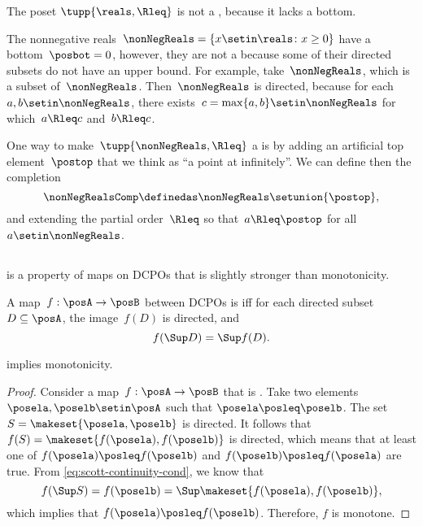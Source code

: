 \begin{example}
    \label{exa:Rcomp}
    The poset $\tupp{\reals, \Rleq}$ is not a \CPO, because it lacks a bottom.

    The nonnegative reals~$\nonNegReals=\{x\setin\reals \colon x\geq0\}$ have a bottom~$\posbot=0$, however, they are not a \DCPO because some of their directed subsets do not have an upper bound.
    For example, take~$\nonNegReals$, which is a subset of~$\nonNegReals$.
    Then~$\nonNegReals$ is directed, because for each~$a,b\setin\nonNegReals$, there exists~$c=\max\{a,b\}\setin\nonNegReals$ for which~$a\Rleq c$ and~$b\Rleq c$.

    One way to make~$\tupp{ \nonNegReals,\Rleq} $ a \CPO is by adding an artificial top element~$\postop$ that we think as ``a point at infinitely''.
    We can define then the completion
    \begin{equation}
        \nonNegRealsComp\definedas\nonNegReals\setunion\{\postop\},
    \end{equation} and extending the partial order~$\Rleq$ so that~$a\Rleq\postop$ for all~$a\setin\nonNegReals$.
\end{example}

\subsection{\scottcontinuity}

\scottcontinuity is a property of maps on DCPOs that is slightly stronger than monotonicity.

\begin{definition}[\scottcontinuity]
    \label{def:scott}
    A map~$f:\posA\rightarrow\posB$ between DCPOs is \emph{\scottcontinuous{}} iff for each directed subset~$D\subseteq\posA$, the image~$f(D)$ is directed, and
    \begin{equation}\label{eq:scott-continuity-cond}
        f(\Sup D)=\Sup f(D).
    \end{equation}
\end{definition}
\begin{lemma}
    \scottcontinuity implies monotonicity.
\end{lemma}
\begin{proof}
    Consider a map~$f:\posA\rightarrow\posB$ that is \scottcontinuous.
    Take two elements $\posela, \poselb \setin \posA$ such that $\posela\posleq\poselb$.
    The set $ S =  \makeset{\posela, \poselb}$ is directed.
    It follows that $f(S) = \makeset{f(\posela), f(\poselb)}$ is directed, which means that at least one
    of $f(\posela) \posleq f(\poselb)$ and $f(\poselb) \posleq f(\posela)$ are true.
    From \cref{eq:scott-continuity-cond}, we know that
    \begin{equation}
        f(\Sup S) = f(\poselb) = \Sup \makeset{f(\posela), f(\poselb)},
    \end{equation}
    which implies that $f(\posela) \posleq f(\poselb)$.
    Therefore, $f$ is monotone.
\end{proof}


